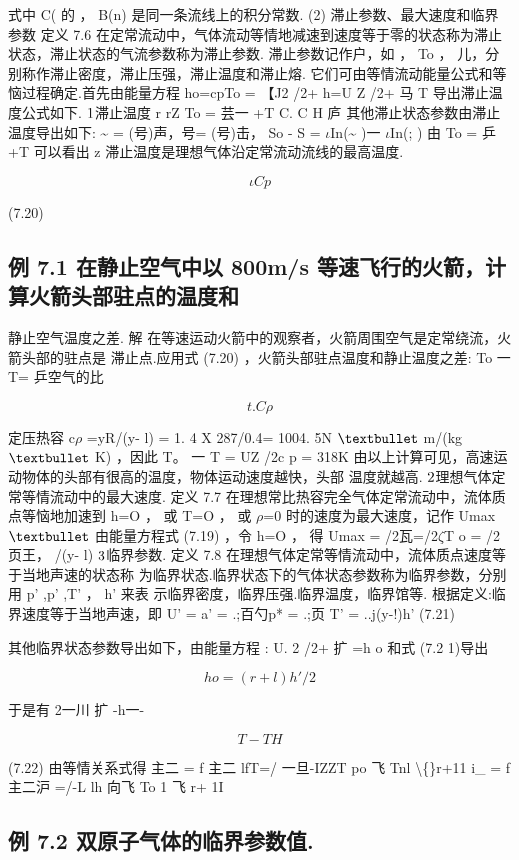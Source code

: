 式中 C( 的 ， B(n) 是同一条流线上的积分常数. (2) 滞止参数、最大速度和临界参数 定义 7.6 在定常流动中，气体流动等情地减速到速度等于零的状态称为滞止 状态，滞止状态的气流参数称为滞止参数. 滞止参数记作户，如 ， To ， 儿，分别称作滞止密度，滞止压强，滞止温度和滞止熔. 它们可由等情流动能量公式和等恼过程确定.首先由能量方程 ho=cpTo = 【J2 /2+ h=U Z /2+ 马 T 导出滞止温度公式如下. ${\rm 1}$滞止温度 r rZ To = 芸一 +T C. C H 庐 其他滞止状态参数由滞止温度导出如下: \textasciitilde{} = (号)声，号= (号)击， So - S = $\iota$In(\textasciitilde{} )一 $\iota$In(; ) 由 To = 乒 +T 可以看出 z 滞止温度是理想气体沿定常流动流线的最高温度.

\[\iota  C p\]

(7.20)

\subsection*{例 7.1  在静止空气中以 800m/s 等速飞行的火箭，计算火箭头部驻点的温度和}

静止空气温度之差. 解 在等速运动火箭中的观察者，火箭周围空气是定常绕流，火箭头部的驻点是 滞止点.应用式 (7.20) ，火箭头部驻点温度和静止温度之差: To 一 T= 乒空气的比

\[t.C \rho \]

定压热容 c$\rho$ =yR/(y- l) = 1. 4 X 287/0.4= 1004. 5N ${\rm •}$ m/(kg ${\rm •}$ K) ，因此 T。 一 T = UZ /2c p = 318K 由以上计算可见，高速运动物体的头部有很高的温度，物体运动速度越快，头部 温度就越高. ${\rm 2}$理想气体定常等情流动中的最大速度. 定义 7.7 在理想常比热容完全气体定常流动中，流体质点等恼地加速到 h=O ， 或 T=O ， 或 $\rho$=0 时的速度为最大速度，记作 Umax ${\rm •}$ 由能量方程式 (7.19) ，令 h=O ， 得 Umax = /2瓦=/2$\zeta$T o = /2页王， /(y- l) ${\rm 3}$临界参数. 定义 7.8 在理想气体定常等情流动中，流体质点速度等于当地声速的状态称 为临界状态.临界状态下的气体状态参数称为临界参数，分别用 p' ,p' ,T' ， h' 来表 示临界密度，临界压强.临界温度，临界馆等. 根据定义:临界速度等于当地声速，即 U' = a' = .;百勺p* = .;页 T' = ..j(y-!)h' (7.21)

其他临界状态参数导出如下，由能量方程 : U. 2 /2+ 扩 =h o 和式 (7.2 1)导出

\[ho = (r+ l) h' /2\]

于是有 2一川 扩 -h一-

\[T-TH\]

(7.22) 由等情关系式得 主二 = f 主二 lfT=/ 一旦-IZZT po 飞 Tnl \textbackslash\{\}r+11 i\_ = f 主二沪 =/-L lh 向飞 To 1 飞 r+ 1I

\subsection*{例 7.2  双原子气体的临界参数值.}

